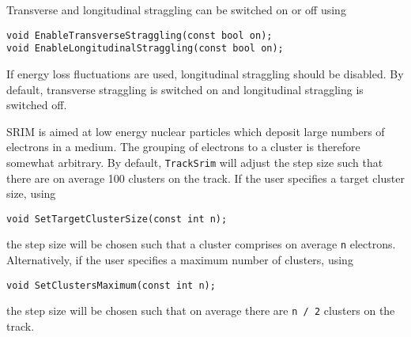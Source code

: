Transverse and longitudinal straggling can be switched on or off using
\begin{lstlisting}
void EnableTransverseStraggling(const bool on);
void EnableLongitudinalStraggling(const bool on);
\end{lstlisting}
If energy loss fluctuations are used, longitudinal straggling should be disabled.
By default, transverse straggling is switched on and longitudinal straggling 
is switched off. 

SRIM is aimed at low energy nuclear particles which deposit large numbers of electrons in a medium. 
The grouping of electrons to a cluster is therefore somewhat arbitrary. 
By default, \texttt{TrackSrim} will adjust the step size such that 
there are on average 100 clusters on the track.
If the user specifies a target cluster size, using
\begin{lstlisting}
void SetTargetClusterSize(const int n);
\end{lstlisting}
the step size will be chosen such that a cluster comprises on average 
\texttt{n} electrons. Alternatively, if the user specifies a maximum 
number of clusters, using
\begin{lstlisting}
void SetClustersMaximum(const int n);
\end{lstlisting}
the step size will be chosen such that on average there are 
\texttt{n / 2} clusters on the track. 

